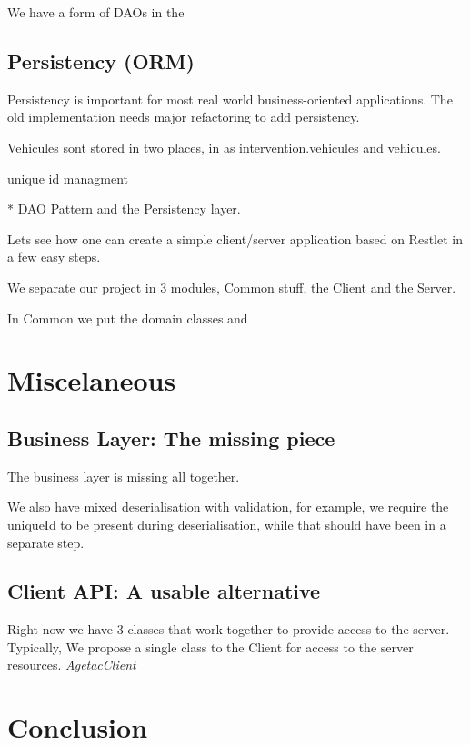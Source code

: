 \documentclass[12pt]{scrartcl}
\begin{document}
We have a form of DAOs in the

\subsection{Persistency (ORM)}

Persistency is important for most real world business-oriented applications. The old implementation needs major refactoring to add persistency.

Vehicules sont stored in two places, in as intervention.vehicules and vehicules.

unique id managment

* DAO Pattern and the Persistency layer.

Lets see how one can create a simple client/server application based on Restlet in a few easy steps.

We separate our project in 3 modules, Common stuff, the Client and the Server.

In Common we put the domain classes and


\section{Miscelaneous}

\subsection{Business Layer: The missing piece}

The business layer is missing all together.

We also have mixed deserialisation with validation, for example, we require the uniqueId to be present during deserialisation, while that should have been in a separate step.

\subsection{Client API: A usable alternative}

Right now we have 3 classes that work together to provide access to the server. Typically, We propose a single class to the Client for access to the server resources. \emph{AgetacClient}

\section*{Conclusion} 



\end{document}
